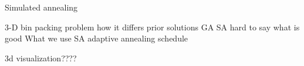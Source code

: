 Simulated annealing

3-D bin packing problem 
	how it differs
prior solutions
	GA
	SA
	hard to say what is good
What we use
	SA
	adaptive annealing schedule 
	
3d visualization????